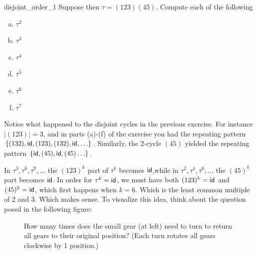 

\begin{exercise}{disjoint_order_1}
Suppose then $\tau = (1 2 3)( 4 5)$. Compute each of the following
\begin{multicols}{3}
\begin{enumerate}[(a)]
\item 
$\tau^2$
\item 
$\tau^3$
\item 
$\tau^4$
\item 
$\tau^5$
\item 
$\tau^6$
\item
$\tau^7$
\end{enumerate}
\end{multicols}
\end{exercise}

\noindent
Notice what happened to the disjoint cycles in the previous exercise.  For instance $|(1 2 3)| = 3$, and in parts (a)-(f) of the exercise you had the repeating pattern $\{(1 3 2), {\sf{i}d}, (1 2 3), (1 3 2), {\sf{i}d}, \ldots\}$.  Similarly, the 2-cycle $(4 5)$ yielded the repeating pattern  $\{{\sf{i}d}, (4 5), {\sf{i}d}, (4 5) \ldots \}$.  

In $\tau^3, \tau^6, \tau^9, \ldots$  the $(1 2 3)^k$ part of $\tau^k$ becomes ${\sf{i}d} $,while in  $\tau^2, \tau^4, \tau^6, \ldots$ the $(4 5)^k$ part  becomes ${\sf{i}d} $.  In order for $\tau^k = {\sf{i}d} $, we must have both $(1 2 3)^k = {\sf{i}d} $ and $(4 5)^k = {\sf{i}d} $, which first happens when $k = 6$. Which is the least common multiple of 2 and 3.  Which makes sense.  To visualize this idea, think about the question posed in the following figure:

\begin{figure}[htb]
	  \caption{\label{fig:wheels:2} How many times does the small gear (at left) need to turn to return all gears to their original position? (Each turn rotates all  gears clockwise by 1 position.)}
\end{figure}

